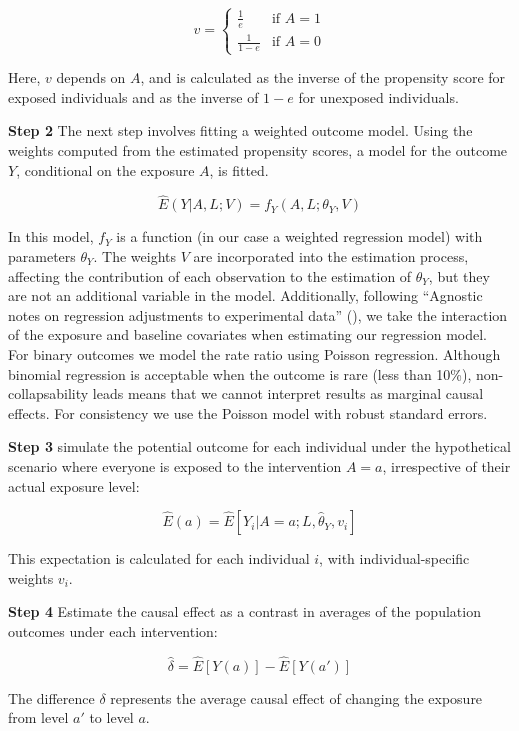 \documentclass[
  singlecolumn]{article}
\begin{document}
\[
v = 
\begin{cases} 
\frac{1}{e} & \text{if } A = 1 \\
\frac{1}{1-e} & \text{if } A = 0 
\end{cases}
\]

Here, \(v\) depends on \(A\), and is calculated as the inverse of the
propensity score for exposed individuals and as the inverse of \(1-e\)
for unexposed individuals.

\textbf{Step 2} The next step involves fitting a weighted outcome model.
Using the weights computed from the estimated propensity scores, a model
for the outcome \(Y\), conditional on the exposure \(A\), is fitted.

\[ \hat{E}(Y|A, L; V) = f_Y(A, L ; \theta_Y, V) \]

In this model, \(f_Y\) is a function (in our case a weighted regression
model) with parameters \(θ_Y\). The weights \(V\) are incorporated into
the estimation process, affecting the contribution of each observation
to the estimation of \(θ_Y\), but they are not an additional variable in
the model. Additionally, following {``Agnostic notes on regression
adjustments to experimental data''} (), we
take the interaction of the exposure and baseline covariates when
estimating our regression model. For binary outcomes we model the rate
ratio using Poisson regression. Although binomial regression is
acceptable when the outcome is rare (less than 10\%), non-collapsability
leads means that we cannot interpret results as marginal causal effects.
For consistency we use the Poisson model with robust standard errors.

\textbf{Step 3} simulate the potential outcome for each individual under
the hypothetical scenario where everyone is exposed to the intervention
\(A=a\), irrespective of their actual exposure level:

\[\hat{E}(a) = \hat{E}[Y_i|A=a; L,\hat{\theta}_Y, v_i]\]

This expectation is calculated for each individual \(i\), with
individual-specific weights \(v_i\).

\textbf{Step 4} Estimate the causal effect as a contrast in averages of
the population outcomes under each intervention:

\[\hat{\delta} = \hat{E}[Y(a)] - \hat{E}[Y(a')]\]

The difference \(\delta\) represents the average causal effect of
changing the exposure from level \(a'\) to level \(a\).
\end{document}
